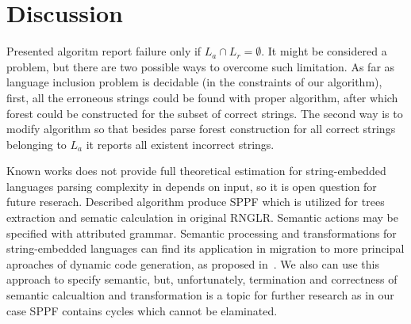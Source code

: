 \section{Discussion}

Presented algoritm report failure only if $L_a \cap L_r = \emptyset$. It might be considered a problem, but there are two possible ways to overcome such limitation. 
As far as language inclusion problem is decidable (in the constraints of our algorithm), first, all the erroneous strings could be found with proper algorithm, 
after which forest could be constructed for the subset of correct strings. 
The second way is to modify algorithm so that besides parse forest construction for all correct strings belonging to $L_a$ 
it reports all existent incorrect strings.

Known works does not provide full theoretical estimation for string-embedded languages parsing complexity in depends on input, so it is open question for future reserach.
Described algorithm produce SPPF which is utilized for trees extraction and sematic calculation in original RNGLR. Semantic actions may be specified with attributed grammar.
Semantic processing and transformations for string-embedded languages can find its application in migration to more principal aproaches of dynamic code generation, as proposed in~\cite{EvalToStaged}.
We also can use this approach to specify semantic, but, unfortunately, termination and correctness of semantic calcualtion and transformation is a topic for further research 
as in our case SPPF contains cycles which cannot be elaminated. 

